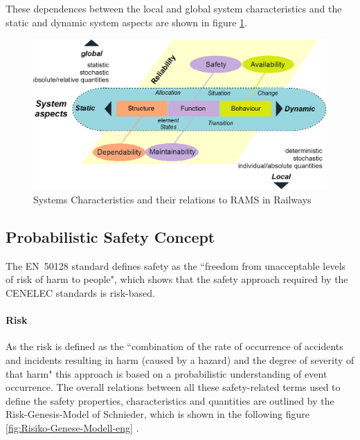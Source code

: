 \documentclass{template/openetcs_report}
\begin{document}
These dependences between the local and global system characteristics and the static and dynamic system aspects are shown in figure \ref{fig:Reliability-RAMS}. 

\begin{figure}[htbp]
\centering
\includegraphics[width=0.7\linewidth]{images/bld_Reliability-system-characteristics}
\caption{Systems Characteristics and their relations to RAMS in Railways \cite{Schnieder.2013}}
\label{fig:Reliability-RAMS}
\end{figure}


\subsection{Probabilistic Safety Concept}

The EN~50128 standard defines safety as the ``freedom from unacceptable levels of risk of harm to people", which shows that the safety approach required by the CENELEC standards is risk-based.

\paragraph{Risk}

 As the risk is defined as the ``combination of the rate of occurrence of accidents and incidents resulting in harm (caused by a hazard) and the degree of severity  of that harm" this approach is based on a probabilistic understanding of event occurrence. The overall relations between all these safety-related terms used to define the safety properties, characteristics and quantities are outlined by the Risk-Genesis-Model of Schnieder, which is shown in the following figure \ref{fig:Risiko-Genese-Modell-eng} \cite{Schnieder.2010}.
\end{document}
